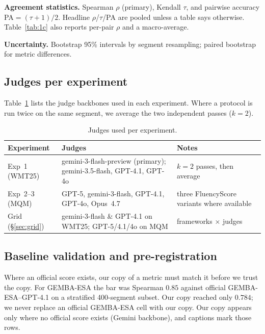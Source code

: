 \documentclass[11pt]{article}
\newcommand{\FS}{FluencyScore}
\begin{document}
\textbf{Agreement statistics.}
Spearman $\rho$ (primary), Kendall $\tau$, and pairwise accuracy
PA${=}(\tau{+}1)/2$.
Headline $\rho$/$\tau$/PA are pooled unless a table says otherwise.
Table~\ref{tab:1c} also reports per-pair $\rho$ and a macro-average.

\textbf{Uncertainty.}
Bootstrap 95\% intervals by segment resampling; paired bootstrap for metric
differences.

\subsection{Judges per experiment}
\label{sec:judges}
Table~\ref{tab:judges} lists the judge backbones used in each experiment.
Where a protocol is run twice on the same segment, we average the two
independent passes ($k{=}2$).

\begin{table}[t]
\centering
\scriptsize
\caption{Judges used per experiment.}
\label{tab:judges}
\begin{tabularx}{\columnwidth}{>{\raggedright\arraybackslash}X>{\raggedright\arraybackslash}X>{\raggedright\arraybackslash}X}
\toprule
Experiment & Judges & Notes \\
\midrule
Exp~1 (WMT25) & gemini-3-flash-preview (primary); gemini-3.5-flash, GPT-4.1, GPT-4o & $k{=}2$ passes, then average \\
Exp~2--3 (MQM) & GPT-5, gemini-3-flash, GPT-4.1, GPT-4o, Opus~4.7 & three \FS{} variants where available \\
Grid (\S\ref{sec:grid}) & gemini-3-flash \& GPT-4.1 on WMT25; GPT-5/4.1/4o on MQM & frameworks $\times$ judges \\
\bottomrule
\end{tabularx}

\end{table}


\subsection{Baseline validation and pre-registration}
\label{sec:prereg}
Where an official score exists, our copy of a metric must match it before we
trust the copy.
For GEMBA-ESA the bar was Spearman $0.85$ against official GEMBA-ESA--GPT-4.1 on
a stratified 400-segment subset.
Our copy reached only $0.784$; we never replace an official GEMBA-ESA cell with
our copy.
Our copy appears only where no official score exists (Gemini backbone), and
captions mark those rows.
\end{document}
